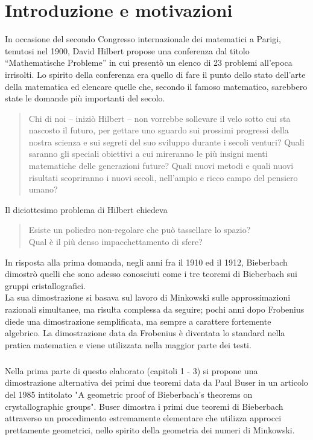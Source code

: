 \documentclass[a4paper]{book}
\author{Elisa Caruso}
\begin{document}
 

\chapter*{Introduzione e motivazioni}

In occasione del secondo Congresso internazionale dei matematici a Parigi, tenutosi nel 1900,  David Hilbert propose una conferenza dal titolo “Mathematische Probleme” in cui presentò un elenco di 23 problemi all'epoca irrisolti. Lo spirito della conferenza era quello di fare il punto dello stato dell'arte della matematica ed elencare quelle che, secondo il famoso matematico, sarebbero state le domande più importanti del secolo.  \\
\begin{quote}
Chi di noi – iniziò Hilbert – non vorrebbe sollevare il velo sotto cui sta nascosto il futuro, per gettare uno sguardo sui prossimi progressi della nostra scienza e sui segreti del suo sviluppo durante i secoli venturi? Quali saranno gli speciali obiettivi a cui mireranno le più insigni menti matematiche delle generazioni future? Quali nuovi metodi e quali nuovi risultati scopriranno i nuovi secoli, nell’ampio e ricco campo del pensiero umano?
\end{quote}
Il diciottesimo problema di Hilbert chiedeva
\begin{quote}
Esiste un poliedro non-regolare che può tassellare lo spazio? \\
Qual è il più denso impacchettamento di sfere?	
\end{quote}
In risposta alla prima domanda, negli anni fra il 1910 ed il 1912, Bieberbach dimostrò quelli che sono adesso conosciuti come i tre teoremi di Bieberbach sui gruppi cristallografici. \\
La sua dimostrazione si basava sul lavoro di Minkowski sulle approssimazioni razionali simultanee, ma risulta complessa da seguire; pochi anni dopo Frobenius diede una dimostrazione semplificata, ma sempre a carattere fortemente algebrico. La dimostrazione data da Frobenius è diventata lo standard nella pratica matematica e viene utilizzata nella maggior parte dei testi.
\paragraph{}
Nella prima parte di questo elaborato (capitoli 1 - 3) si propone una dimostrazione alternativa dei primi due teoremi data da Paul Buser in un articolo del 1985 intitolato "A geometric proof of Bieberbach's theorems on crystallographic groups". Buser dimostra i primi due teoremi di Bieberbach attraverso un procedimento estremamente elementare che utilizza approcci prettamente geometrici, nello spirito della geometria dei numeri di Minkowski. 
\end{document}

